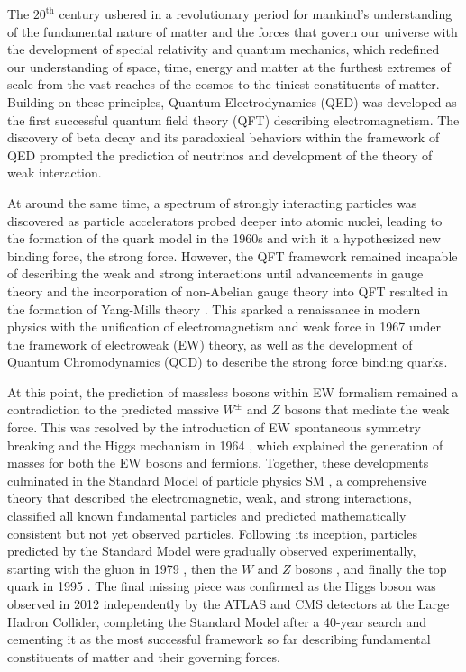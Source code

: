 \documentclass[../thesis.tex]{subfiles}
\begin{document}
\vspace{-1\baselineskip}

The $20^\text{th}$ century ushered in a revolutionary period for mankind's understanding of the fundamental nature of matter and the forces that govern our universe with the development of special relativity and quantum mechanics, which redefined our understanding of space, time, energy and matter at the furthest extremes of scale from the vast reaches of the cosmos to the tiniest constituents of matter. Building on these principles, Quantum Electrodynamics (QED) \tocite was developed as the first successful quantum field theory (\acs{QFT}) describing electromagnetism. The discovery of beta decay \tocite and its paradoxical behaviors within the framework of \acs{QED} prompted the prediction of neutrinos and development of the theory of weak interaction.

At around the same time, a spectrum of strongly interacting particles was discovered \tocite as particle accelerators probed deeper into atomic nuclei, leading to the formation of the quark model in the 1960s \tocite and with it a hypothesized new binding force, the strong force. However, the \acs{QFT} framework remained incapable of describing the weak and strong interactions until advancements in gauge theory and the incorporation of non-Abelian gauge theory into \acs{QFT} resulted in the formation of Yang-Mills theory \citep{theory:yangmills,theory:yangmills2}. This sparked a renaissance in modern physics with the unification of electromagnetism and weak force in 1967 \tocite under the framework of electroweak (\acs{EW}) theory, as well as the development of Quantum Chromodynamics (\acs{QCD}) \tocite to describe the strong force binding quarks.

At this point, the prediction of massless bosons within \acs{EW} formalism remained a contradiction to the predicted massive $W^\pm$ and $Z$ bosons that mediate the weak force. This was resolved by the introduction of \acs{EW} spontaneous symmetry breaking and the Higgs mechanism in 1964 \citep{theory:higgs1,theory:higgs2,theory:brout_englert}, which explained the generation of masses for both the \acs{EW} bosons and fermions. Together, these developments culminated in the Standard Model of particle physics \acs{SM} \tocite, a comprehensive theory that described the electromagnetic, weak, and strong interactions, classified all known fundamental particles and predicted mathematically consistent but not yet observed particles. Following its inception, particles predicted by the Standard Model were gradually observed experimentally, starting with the gluon in 1979 \tocite, then the $W$ and $Z$ bosons \tocite, and finally the top quark in 1995 \tocite. The final missing piece was confirmed as the Higgs boson was observed in 2012 independently by the \acs{ATLAS} \citep{theory:higgs_atlas} and \acs{CMS} \citep{theory:higgs_cms} detectors at the Large Hadron Collider, completing the Standard Model after a 40-year search and cementing it as the most successful framework so far describing fundamental constituents of matter and their governing forces.
\end{document}
